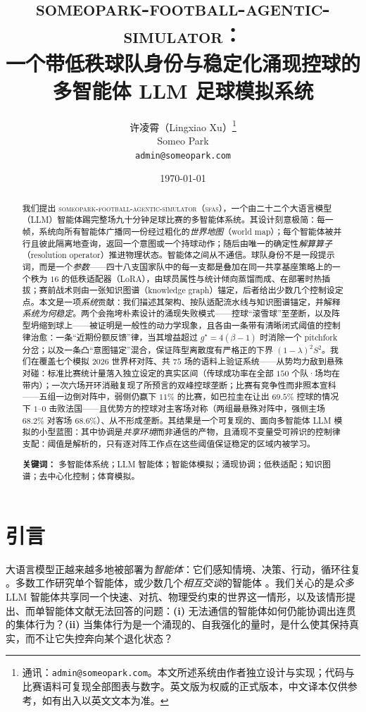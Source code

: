 \documentclass[11pt,UTF8,fontset=fandol]{ctexart}
\title{\bfseries \textsc{someopark-football-agentic-simulator}：\\
一个带低秩球队身份与稳定化涌现控球的\\
多智能体 LLM 足球模拟系统}
\author{许凌霄（Lingxiao Xu）\thanks{通讯：\texttt{admin@someopark.com}。本文所述系统由作者独立设计与实现；代码与比赛语料可复现全部图表与数字。英文版为权威的正式版本，中文译本仅供参考，如有出入以英文文本为准。}\\
\normalsize Someo Park\\
\normalsize \texttt{admin@someopark.com}}
\date{\today}
\newcommand{\sfas}{\textsc{sfas}}
\theoremstyle{plain}
\theoremstyle{definition}
\theoremstyle{remark}
\begin{document}
\maketitle

\begin{abstract}
\noindent 我们提出 \textsc{someopark-football-agentic-simulator}（\sfas），一个由二十二个大语言模型（LLM）智能体踢完整场九十分钟足球比赛的多智能体系统。其设计刻意极简：每一帧，系统向所有智能体广播同一份经过粗化的\emph{世界地图}（world map）；每个智能体被并行且彼此隔离地查询，返回一个意图或一个持球动作；随后由唯一的确定性\emph{解算算子}（resolution operator）推进物理状态。智能体之间从不通信。球队身份不是一段提示词，而是一个\emph{参数}——四十八支国家队中的每一支都是叠加在同一共享基座策略上的一个秩为 $16$ 的低秩适配器（LoRA），由球员属性与统计倾向蒸馏而成、在部署时热插拔；赛前战术则由一张知识图谱（knowledge graph）锚定，后者给出少数几个控制设定点。本文是一项\emph{系统}贡献：我们描述其架构、按队适配流水线与知识图谱锚定，并解释\emph{系统为何稳定}。两个会拖垮朴素设计的涌现失败模式——控球“滚雪球”至垄断，以及阵型坍缩到球上——被证明是一般性的动力学现象，且各由一条带有清晰闭式阈值的控制律治愈：一条“近期份额反馈”律，当其增益超过 $g^\star=4(\beta-1)$ 时消除一个 pitchfork 分岔；以及一条凸“意图锚定”混合，保证阵型离散度有严格正的下界 $(1-\lambda)^2S^2$。我们在覆盖七个模拟 2026 世界杯对阵、共 $75$ 场的语料上验证系统——从势均力敌到悬殊对碰：标准比赛统计量落入独立设定的真实区间（传球成功率在全部 $150$ 个队·场均在带内）；一次六场开环消融复现了所预言的双峰控球垄断；比赛有竞争性而非照本宣科——五组一边倒对阵中，弱侧仍赢下 $11\%$ 的比赛，如巴拉圭在让出 $69.5\%$ 控球的情况下 $1$--$0$ 击败法国——且优势方的控球对主客场对称（两组最悬殊对阵中，强侧主场 $68.2\%$ 对客场 $68.6\%$）、从不形成垄断。其结果是一个可复现的、面向多智能体 LLM 模拟的小型蓝图：其中协调是\emph{共享环境}而非通信的产物，且涌现不变量受可辨识的控制律支配：阈值是解析的，只有逐对阵工作点在这些阈值保证稳定的区域内被学习。

\smallskip
\noindent\textbf{关键词：} 多智能体系统；LLM 智能体；智能体模拟；涌现协调；低秩适配；知识图谱；去中心化控制；体育模拟。
\end{abstract}

\section{引言}\label{sec:intro}

大语言模型正越来越多地被部署为\emph{智能体}：它们感知情境、决策、行动，循环往复 \citep{park2023,wang2023survey,yao2023}。多数工作研究单个智能体，或少数几个\emph{相互交谈}的智能体 \citep{li2023camel}。我们关心的是\emph{众多} LLM 智能体共享同一个快速、对抗、物理受约束的世界这一情形，以及该情形提出、而单智能体文献无法回答的问题：\textbf{(i)} 无法通信的智能体如何仍能协调出连贯的集体行为？\textbf{(ii)} 当集体行为是一个涌现的、自我强化的量时，是什么使其保持真实，而不让它失控奔向某个退化状态？
\end{document}
